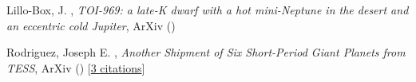 \item[{\color{numcolor}\scriptsize2}] Lillo-Box, J. , \emph{TOI-969: a late-K dwarf with a hot mini-Neptune in the desert and an eccentric cold Jupiter}, ArXiv ()

\item[{\color{numcolor}\scriptsize1}] Rodriguez, Joseph E. , \emph{Another Shipment of Six Short-Period Giant Planets from TESS}, ArXiv () [\href{https://ui.adsabs.harvard.edu/abs/2022arXiv220505709R}{3 citations}]